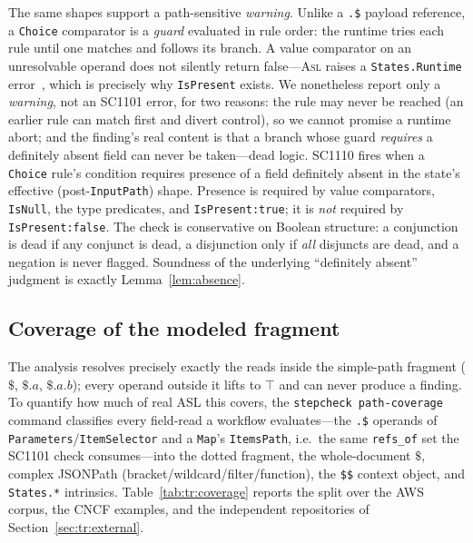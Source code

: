 \documentclass[11pt]{article}
\newcommand{\code}[1]{\textsf{\small #1}}
\newcommand{\asl}{\textsc{Asl}}
\theoremstyle{plain}
\theoremstyle{definition}
\theoremstyle{remark}
\begin{document}
The same shapes support a path-sensitive \emph{warning}. Unlike a \texttt{.\$} payload
reference, a \texttt{Choice} comparator is a \emph{guard} evaluated in rule order: the runtime
tries each rule until one matches and follows its branch. A value comparator on an unresolvable
operand does not silently return false---\asl{} raises a \texttt{States.Runtime}
error~\cite{awsasl}, which is precisely why \texttt{IsPresent} exists. We nonetheless report only
a \emph{warning}, not an \code{SC1101} error, for two reasons: the rule may never be reached (an
earlier rule can match first and divert control), so we cannot promise a runtime abort; and the
finding's real content is that a branch whose guard \emph{requires} a definitely absent field
can never be taken---dead logic. \code{SC1110} fires when a \texttt{Choice} rule's condition
requires presence of a field definitely absent in the state's effective (post-\texttt{InputPath})
shape. Presence is required by value comparators, \texttt{IsNull}, the type predicates, and
\texttt{IsPresent:true}; it is \emph{not} required by \texttt{IsPresent:false}. The check is
conservative on Boolean structure: a conjunction is dead if any conjunct is dead, a disjunction
only if \emph{all} disjuncts are dead, and a negation is never flagged. Soundness of the
underlying ``definitely absent'' judgment is exactly Lemma~\ref{lem:absence}.

\subsection{Coverage of the modeled fragment}
\label{sec:tr:coverage}

The analysis resolves precisely exactly the reads inside the simple-path fragment ($\$$, $\$.a$,
$\$.a.b$); every operand outside it lifts to $\top$ and can never produce a finding. To quantify
how much of real ASL this covers, the \texttt{stepcheck path-coverage} command classifies every
field-read a workflow evaluates---the \texttt{.\$} operands of \texttt{Parameters}/\texttt{ItemSelector}
and a \texttt{Map}'s \texttt{ItemsPath}, i.e.\ the same \texttt{refs\_of} set the \code{SC1101}
check consumes---into the dotted fragment, the whole-document $\$$, complex JSONPath
(bracket/wildcard/filter/function), the \texttt{\$\$} context object, and \texttt{States.*}
intrinsics. Table~\ref{tab:tr:coverage} reports the split over the AWS corpus, the CNCF examples,
and the independent repositories of Section~\ref{sec:tr:external}.
\end{document}
